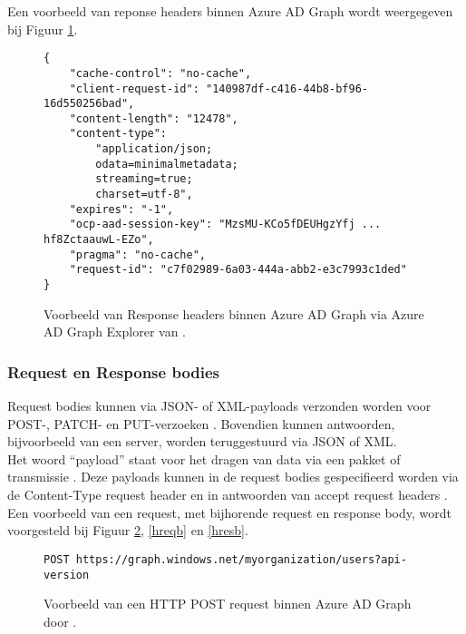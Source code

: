 Een voorbeeld van reponse headers binnen Azure \ac{AD} Graph wordt weergegeven bij Figuur \ref{rhaad}. \\

\begin{figure}[h!]
    \scriptsize
    \begin{verbatim} 
{
    "cache-control": "no-cache",
    "client-request-id": "140987df-c416-44b8-bf96-16d550256bad",
    "content-length": "12478",
    "content-type": 
        "application/json; 
        odata=minimalmetadata; 
        streaming=true; 
        charset=utf-8",
    "expires": "-1",
    "ocp-aad-session-key": "MzsMU-KCo5fDEUHgzYfj ... hf8ZctaauwL-EZo",
    "pragma": "no-cache",
    "request-id": "c7f02989-6a03-444a-abb2-e3c7993c1ded"
}
    \end{verbatim}
    \caption[Voorbeeld Response headers Azure AD Graph]{Voorbeeld van Response headers binnen Azure \ac{AD} Graph via Azure \Ac{AD} Graph Explorer van \textcite{Microsoft}.}
    \label{rhaad}
\end{figure}




\subsubsection{Request en Response bodies}


Request bodies kunnen via \Ac{JSON}- of \ac{XML}-payloads verzonden worden voor POST-, PATCH- en PUT-verzoeken \autocite{Microsoft2015}. Bovendien kunnen antwoorden, bijvoorbeeld van een server, worden teruggestuurd via \ac{JSON} of \ac{XML}. \\

Het woord “payload” staat voor het dragen van data via een pakket of transmissie \autocite{Comer2006}. Deze payloads kunnen in de request bodies gespecifieerd worden via de Content-Type request header en in antwoorden van accept request headers \autocite{Microsoft2015}. Een voorbeeld van een request, met bijhorende request en response body, wordt voorgesteld bij Figuur \ref{hpr}, \ref{hreqb} en \ref{hresb}. \\

\begin{figure}[h!]
    \scriptsize
    \begin{verbatim}
POST https://graph.windows.net/myorganization/users?api-version
    \end{verbatim}
    \caption[Voorbeeld HTTP POST request]{Voorbeeld van een \ac{HTTP} POST request binnen Azure \ac{AD} Graph door \textcite{Microsoft2015}.}
    \label{hpr}
\end{figure}

